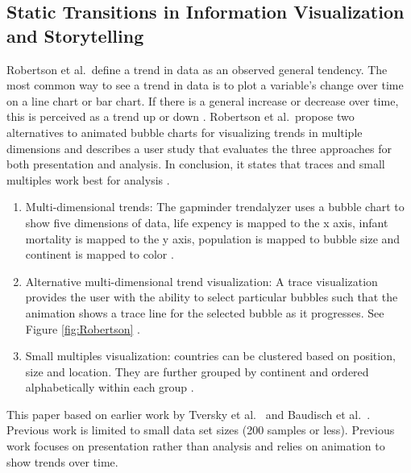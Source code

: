 \documentclass{egpubl}
\begin{document}
\subsection{Static Transitions in Information Visualization and Storytelling}
Robertson et al.\ define a trend in data as an observed general tendency. The most common way to see a trend in data is to plot a variable's change over time on a line chart or bar chart. If there is a general increase or decrease over time, this is perceived as a trend up or down \cite{Rebortson}.
Robertson et al.\ propose two alternatives to animated bubble charts for visualizing trends in multiple dimensions and describes a user study that evaluates the three approaches for both presentation and analysis. In conclusion, it states that traces and small multiples work best for analysis \cite{Rebortson}.
\begin{enumerate}
\item Multi-dimensional trends: The gapminder trendalyzer uses a bubble chart to show five dimensions of data, life expency is mapped to the x axis, infant mortality is mapped to the y axis, population is mapped to bubble size and continent is mapped to color \cite{ted1}.
\item Alternative multi-dimensional trend visualization: A trace visualization provides the user with the ability to select particular bubbles such that the animation shows a trace line for the selected bubble as it progresses. See Figure \ref{fig:Robertson} \cite{ted2}.
\item Small multiples visualization: countries can be clustered based on position, size and location. They are further grouped by continent and ordered alphabetically within each group \cite{Tufte}.
\end{enumerate}
This paper based on earlier work by Tversky et al.\ \cite{tversky} and Baudisch et al.\ \cite{baudisch}. Previous work is limited to small data set sizes (200 samples or less). Previous work focuses on presentation rather than analysis and relies on animation to show trends over time.
\end{document}
